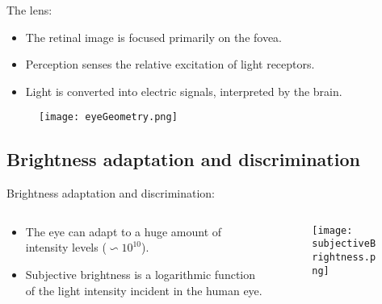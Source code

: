 \begin{frame}
The lens:
\begin{itemize}
\item The retinal image is focused primarily on the fovea.
\item Perception senses the relative excitation of light receptors.
\item Light is converted into electric signals, interpreted by the brain.
\end{itemize}
\begin{figure}
\texttt{[image: eyeGeometry.png]}
\end{figure}
\end{frame}


\subsection{Brightness adaptation and discrimination}

\begin{frame}
Brightness adaptation and discrimination:
\begin{columns}
\begin{column}{.5\textwidth}
\begin{itemize}
\item The eye can adapt to a huge amount of intensity levels ($\backsim 10^{10}$).
\item Subjective brightness is a logarithmic function  of the light intensity incident in the human eye.
\end{itemize}
\end{column}
\begin{column}{.5\textwidth}
\begin{figure}
\texttt{[image: subjectiveBrightness.png]}
\end{figure}
\end{column}
\end{columns}
\end{frame}



